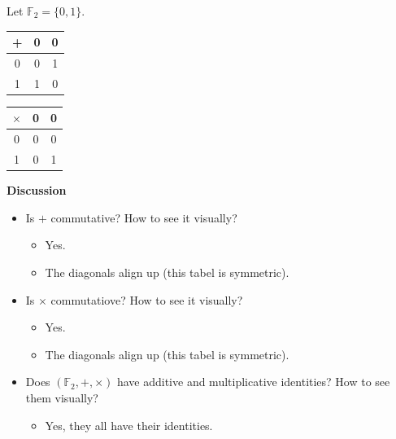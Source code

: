 \documentclass[11pt,fleqn]{book} %
\begin{document}
\begin{example}
    Let $\mathbb{F}_2 = \{ 0, 1 \}$.

    \begin{center}
        \begin{tabular}{c | c c}
            \toprule
            + &0 &0 \\
            \midrule
            0 &0 &1 \\
            1 &1 &0 \\
            \bottomrule
        \end{tabular}
        \hspace{0.25\linewidth}
        \begin{tabular}{c | c c}
            \toprule
            $\times$ &0 &0 \\
            \midrule
            0 &0 &0 \\
            1 &0 &1 \\
            \bottomrule
        \end{tabular}
    \end{center}

    \textbf{Discussion}

    \begin{itemize}
        \item Is $+$ commutative? How to see it visually?

        \begin{itemize}
            \item Yes.

            \item The diagonals align up (this tabel is symmetric).
        \end{itemize}

        \item Is $\times$ commutatiove? How to see it visually?

        \begin{itemize}
            \item Yes.

            \item The diagonals align up (this tabel is symmetric).
        \end{itemize}

        \item Does $(\mathbb{F}_2, +, \times)$ have additive and multiplicative identities? How to see them visually?

        \begin{itemize}
            \item Yes, they all have their identities.


\end{itemize}
\end{itemize}
\end{example}
\end{document}
